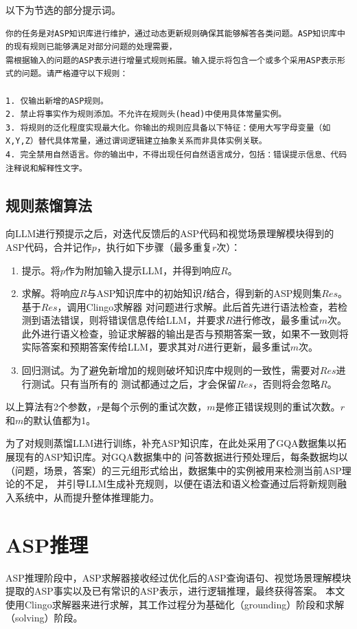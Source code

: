 以下为节选的部分提示词。
\begin{lstlisting}
你的任务是对ASP知识库进行维护，通过动态更新规则确保其能够解答各类问题。ASP知识库中的现有规则已能够满足对部分问题的处理需要，
需根据输入的问题的ASP表示进行增量式规则拓展。输入提示将包含一个或多个采用ASP表示形式的问题。请严格遵守以下规则：

1. 仅输出新增的ASP规则。
2. 禁止将事实作为规则添加。不允许在规则头(head)中使用具体常量实例。
3. 将规则的泛化程度实现最大化。你输出的规则应具备以下特征：使用大写字母变量（如X,Y,Z）替代具体常量，通过谓词逻辑建立抽象关系而非具体实例关联。
4. 完全禁用自然语言。你的输出中，不得出现任何自然语言成分，包括：错误提示信息、代码注释说和解释性文字。
\end{lstlisting}
\subsection{规则蒸馏算法}
向LLM进行预提示之后，对迭代反馈后的ASP代码和视觉场景理解模块得到的ASP代码，合并记作$p$，执行如下步骤（最多重复$r$次）：

\begin{enumerate}[itemsep=0pt,parsep=0pt]
    \item 提示。将$p$作为附加输入提示LLM，并得到响应$R$。
    \item 求解。将响应$R$与ASP知识库中的初始知识$I$结合，得到新的ASP规则集$Res$。基于$Res$，调用Clingo求解器
对问题进行求解。此后首先进行语法检查，若检测到语法错误，则将错误信息传给LLM，并要求$R$进行修改，最多重试$m$次。
此外进行语义检查，验证求解器的输出是否与预期答案一致，如果不一致则将实际答案和预期答案传给LLM，要求其对$R$进行更新，最多重试$m$次。
    \item 回归测试。为了避免新增加的规则破坏知识库中规则的一致性，需要对$Res$进行测试。只有当所有的
测试都通过之后，才会保留$Res$，否则将会忽略$R$。
\end{enumerate}

以上算法有2个参数，$r$是每个示例的重试次数，$m$是修正错误规则的重试次数。$r$和$m$的默认值都为1。

为了对规则蒸馏LLM进行训练，补充ASP知识库，在此处采用了GQA数据集以拓展现有的ASP知识库。对GQA数据集中的
问答数据进行预处理后，每条数据均以（问题，场景，答案）的三元组形式给出，数据集中的实例被用来检测当前ASP理论的不足，
并引导LLM生成补充规则，以便在语法和语义检查通过后将新规则融入系统中，从而提升整体推理能力。 
\section{ASP推理}
ASP推理阶段中，ASP求解器接收经过优化后的ASP查询语句、视觉场景理解模块提取的ASP事实以及已有常识的ASP表示，进行逻辑推理，最终获得答案。
本文使用Clingo求解器来进行求解，其工作过程分为基础化（grounding）阶段和求解（solving）阶段。

